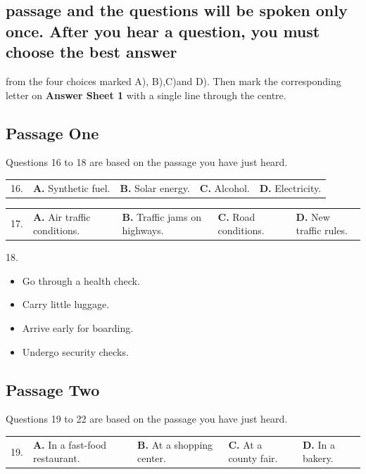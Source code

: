 \documentclass[UTF8,11pt]{ctexart}
\begin{document}
\subsection*{passage and the questions will be spoken only once. After you hear a question, you must choose the best answer}


from the four choices marked A), B),C)and D). Then mark the corresponding letter on\textbf{ Answer Sheet 1} with a single line through the centre.


\subsection*{Passage One}


Questions 16 to 18 are based on the passage you have just heard.


\noindent\begin{tabularx}{\linewidth}{@{}lXXXX@{}}16. & \textbf{A.} Synthetic fuel. & \textbf{B.} Solar energy. & \textbf{C.} Alcohol. & \textbf{D.} Electricity.\\\end{tabularx}\par

\noindent\begin{tabularx}{\linewidth}{@{}lXXXX@{}}17. & \textbf{A.} Air traffic conditions. & \textbf{B.} Traffic jams on highways. & \textbf{C.} Road conditions. & \textbf{D.} New traffic rules.\\\end{tabularx}\par

18.


\begin{itemize}[leftmargin=2em,itemsep=.2em,topsep=.4em]\item[A.] Go through a health check.
\item[B.] Carry little luggage.
\item[C.] Arrive early for boarding.
\item[D.] Undergo security checks.
\end{itemize}

\subsection*{Passage Two}


Questions 19 to 22 are based on the passage you have just heard.


\noindent\begin{tabularx}{\linewidth}{@{}lXXXX@{}}19. & \textbf{A.} In a fast-food restaurant. & \textbf{B.} At a shopping center. & \textbf{C.} At a county fair. & \textbf{D.} In a bakery.\\\end{tabularx}\par
\end{document}
